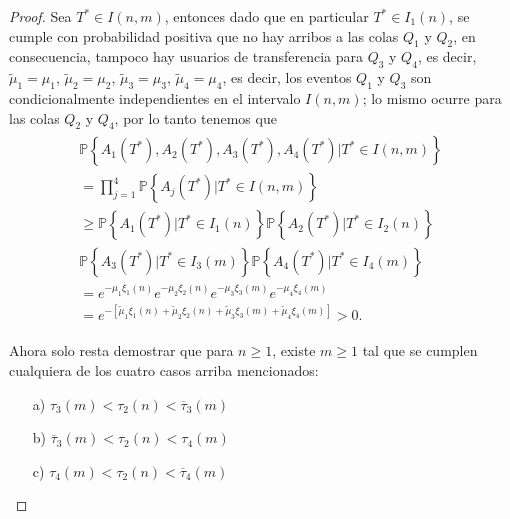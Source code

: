 \documentclass{article}
\newcommand{\prob}{\mathbb{P}}
\begin{document}
\begin{proof}
Sea $T^{*}\in I\left(n,m\right)$, entonces dado que en particular $T^{*}\in I_{1}\left(n\right)$, se cumple con probabilidad positiva que no hay arribos a las colas $Q_{1}$ y $Q_{2}$, en consecuencia, tampoco hay usuarios de transferencia para $Q_{3}$ y $Q_{4}$, es decir, $\tilde{\mu}_{1}=\mu_{1}$, $\tilde{\mu}_{2}=\mu_{2}$, $\tilde{\mu}_{3}=\mu_{3}$, $\tilde{\mu}_{4}=\mu_{4}$, es decir, los eventos $Q_{1}$ y $Q_{3}$ son condicionalmente independientes en el intervalo $I\left(n,m\right)$; lo mismo ocurre para las colas $Q_{2}$ y $Q_{4}$, por lo tanto tenemos que
\begin{eqnarray}
\begin{array}{l}
\prob\left\{A_{1}\left(T^{*}\right),A_{2}\left(T^{*}\right),
A_{3}\left(T^{*}\right),A_{4}\left(T^{*}\right)|T^{*}\in I\left(n,m\right)\right\}\\
=\prod_{j=1}^{4}\prob\left\{A_{j}\left(T^{*}\right)|T^{*}\in I\left(n,m\right)\right\}\\
\geq\prob\left\{A_{1}\left(T^{*}\right)|T^{*}\in I_{1}\left(n\right)\right\}
\prob\left\{A_{2}\left(T^{*}\right)|T^{*}\in I_{2}\left(n\right)\right\}\\
\prob\left\{A_{3}\left(T^{*}\right)|T^{*}\in I_{3}\left(m\right)\right\}
\prob\left\{A_{4}\left(T^{*}\right)|T^{*}\in I_{4}\left(m\right)\right\}\\
=e^{-\mu_{1}\xi_{1}\left(n\right)}
e^{-\mu_{2}\xi_{2}\left(n\right)}
e^{-\mu_{3}\xi_{3}\left(m\right)}
e^{-\mu_{4}\xi_{4}\left(m\right)}\\
=e^{-\left[\tilde{\mu}_{1}\xi_{1}\left(n\right)
+\tilde{\mu}_{2}\xi_{2}\left(n\right)
+\tilde{\mu}_{3}\xi_{3}\left(m\right)
+\tilde{\mu}_{4}\xi_{4}
\left(m\right)\right]}>0.
\end{array}
\end{eqnarray}


Ahora solo resta demostrar que para $n\ge1$, existe $m\geq1$ tal que se cumplen cualquiera de los cuatro casos arriba mencionados: 

\begin{itemize}
\item[a)] $\tau_{3}\left(m\right)<\tau_{2}\left(n\right)<\overline{\tau}_{3}\left(m\right)$

\item[b)] $\overline{\tau}_{3}\left(m\right)<\tau_{2}\left(n\right)
<\tau_{4}\left(m\right)$

\item[c)] $\tau_{4}\left(m\right)<\tau_{2}\left(n\right)<
\overline{\tau}_{4}\left(m\right)$


\end{itemize}
\end{proof}
\end{document}
